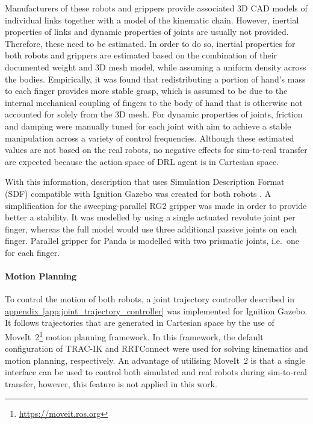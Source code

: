 Manufacturers of these robots and grippers provide associated 3D CAD models of individual links together with a model of the kinematic chain. However, inertial properties of links and dynamic properties of joints are usually not provided. Therefore, these need to be estimated. In order to do so, inertial properties for both robots and grippers are estimated based on the combination of their documented weight and 3D mesh model, while assuming a uniform density across the bodies. Empirically, it was found that redistributing a portion of hand's mass to each finger provides more stable grasp, which is assumed to be due to the internal mechanical coupling of fingers to the body of hand that is otherwise not accounted for solely from the 3D mesh. For dynamic properties of joints, friction and damping were manually tuned for each joint with aim to achieve a stable manipulation across a variety of control frequencies. Although these estimated values are not based on the real robots, no negative effects for sim-to-real transfer are expected because the action space of DRL agent is in Cartesian space.

With this information, description that uses Simulation Description Format (SDF) compatible with Ignition Gazebo was created for both robots \cite{orsula_manipulators_2021}. A simplification for the sweeping-parallel RG2 gripper was made in order to provide better a stability. It was modelled by using a single actuated revolute joint per finger, whereas the full model would use three additional passive joints on each finger. Parallel gripper for Panda is modelled with two prismatic joints, i.e.~one for each finger.

\paragraph{Motion Planning} To control the motion of both robots, a joint trajectory controller described in \hyperref[app:joint_trajectory_controller]{appendix~\ref*{app:joint_trajectory_controller}} was implemented for Ignition Gazebo. It follows trajectories that are generated in Cartesian space by the use of MoveIt~2\footnote{\href{https://moveit.ros.org}{https://moveit.ros.org}} motion planning framework. In this framework, the default configuration of TRAC-IK \cite{beeson_trac-ik_2015} and RRTConnect \cite{kuffner_rrt-connect_2000} were used for solving kinematics and motion planning, respectively. An advantage of utilising MoveIt~2 is that a single interface can be used to control both simulated and real robots during sim-to-real transfer, however, this feature is not applied in this work.



